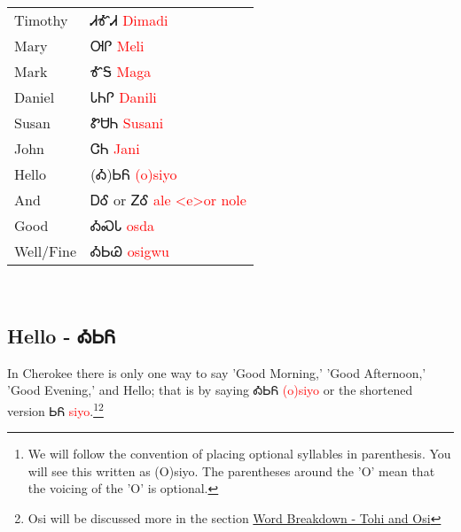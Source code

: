 \begin{multicols}
\begin{minipage}{\linewidth}
\begin{tabular}{p{5cm} p{9cm}}
Timothy & ᏗᎹᏗ 
 \newline \textcolor{red}{Dimadi}\\
Mary & ᎺᎵ 
 \newline \textcolor{red}{Meli}\\
Mark & ᎹᎦ 
 \newline \textcolor{red}{Maga}\\
Daniel & ᏓᏂᎵ 
 \newline \textcolor{red}{Danili}\\
Susan & ᏑᏌᏂ 
 \newline \textcolor{red}{Susani}\\
John & ᏣᏂ 
 \newline \textcolor{red}{Jani}\\
Hello & (Ꭳ)ᏏᏲ 
 \newline \textcolor{red}{(o)siyo}\\
And & ᎠᎴ 
  or ᏃᎴ 
 \newline \textcolor{red}{ale <e>or nole}\\
Good & ᎣᏍᏓ 
 \newline \textcolor{red}{osda}\\
Well/Fine & ᎣᏏᏊ 
 \newline \textcolor{red}{osigwu}\\
\end{tabular}
\end{minipage}

\
\subsection{Hello - ᎣᏏᏲ}
In Cherokee there is only one way to say 'Good Morning,' 'Good Afternoon,' 'Good Evening,' and Hello; that is by saying ᎣᏏᏲ \textcolor{red}{(o)siyo} or the shortened version ᏏᏲ \textcolor{red}{siyo}.\footnote{We will follow the convention of placing optional syllables in parenthesis.  You will see this written as (O)siyo.  The parentheses around the 'O' mean that the voicing of the 'O' is optional.}\footnote{Osi will be discussed more in the section \hyperref[sec:wordBreakdownTohiOsi]{Word Breakdown - Tohi and Osi}}

\end{multicols}
